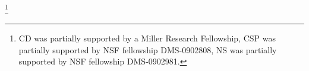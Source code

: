 \documentclass{amsart}
\begin{document}
\author{Christopher L. Douglas}
\address{Mathematical Institute\\ University of Oxford\\ Oxford OX1 3LB\\ United Kingdom}
      	
\author{Christopher Schommer-Pries}
\address{Department of Mathematics\\ Massachusetts Institute of Technology\\ Cambridge, MA 02139\\ USA}

\author{Noah Snyder}
\address{Department of Mathematics\\ Columbia University\\ New York, NY 10027\\ USA}

\thanks{CD was partially supported by a Miller Research Fellowship, CSP was partially supported by NSF fellowship DMS-0902808,  NS was partially supported by NSF fellowship DMS-0902981.
}



\maketitle	

\tikzexternaldisable
{}
\tikzexternalenable

\setcounter{tocdepth}{3}
\tableofcontents



\end{document}
